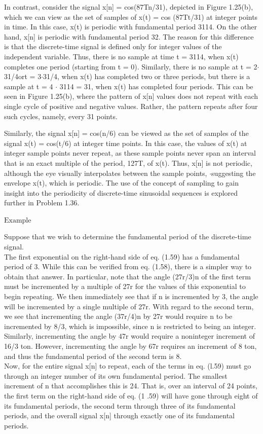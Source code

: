 \documentclass{report}
\begin{document}
In contrast, consider the signal x[n] = cos(87Tn/31), depicted in Figure 1.25(b), which we can view as the set of samples of x(t) = cos (87Tt/31)
at integer points in time. In this case, x(t) is periodic with fundamental period 3114. On the other hand, x[n] is periodic with fundamental period
32. The reason for this difference is that the discrete-time signal is defined only for integer values of the independent variable. Thus, there is
no sample at time t = 3114, when x(t) completes one period (starting from t = 0). Similarly, there is no sample at t = 2$\cdot $31/4ort = 3$\cdot
$31/4, when x(t) has completed two or three periods, but there is a sample at t = 4 $\cdot $ 3114 = 31, when x(t) has completed four periods. This
can be seen in Figure 1.25(b), where the pattern of x[n] values does not repeat with each single cycle of positive and negative values. Rather, the
pattern repeats after four such cycles, namely, every 31 points.

Similarly, the signal x[n] = cos(n/6) can be viewed as the set of samples of the signal x(t) = cos(t/6) at integer time points. In this case, the
values of x(t) at integer sample points never repeat, as these sample points never span an interval that is an exact multiple of the period, 127T,
of x(t). Thus, x[n] is not periodic, although the eye visually interpolates between the sample points, $\cdot $suggesting the envelope x(t), which
is periodic. The use of the concept of sampling to gain insight into the periodicity of discrete-time sinusoidal sequences is explored further in
Problem 1.36.

\(\text{Example}\)

Suppose that we wish to determine the fundamental period of the discrete-time signal. \\
The first exponential on the right-hand side of eq. (1.59) has a fundamental period of 3. While this can be verified from eq. (1.58), there is a
simpler way to obtain that answer. In particular, note that the angle (27r/3)n of the first term must be incremented by a multiple of 27r for the
values of this exponential to begin repeating. We then immediately see that if n is incremented by 3, the angle will be incremented by a single multiple
of 27r. With regard to the second term, we see that incrementing the angle (37r/4)n by 27r would require n to be incremented by 8/3, which is impossible,
since n is restricted to being an integer. Similarly, incrementing the angle by 47r would require a noninteger increment of 16/3 ton. However, incrementing
the angle by 67r requires an increment of 8 ton, and thus the fundamental period of the second term is 8.\\
Now, for the entire signal x[n] to repeat, each of the terms in eq. (l.59) must go through an integer number of its own fundamental period. The smallest
increment of n that accomplishes this is 24. That is, over an interval of 24 points, the first term on the right-hand side of eq. (1 .59) will have
gone through eight of its fundamental periods, the second term through three of its fundamental periods, and the overall signal x[n] through exactly
one of its fundamental periods.
\end{document}
